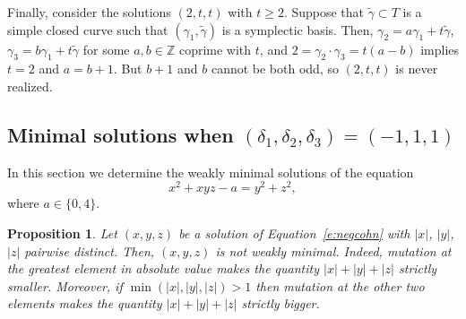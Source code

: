 \documentclass[11pt,a4paper]{amsart}
\newcommand{\Z}{\mathbb Z}
\newcommand{\de}{\delta}
\newcommand{\ga}{\gamma}
\newtheorem{prop}[thm]{Proposition}
\theoremstyle{definition}
\numberwithin{equation}{section}
\begin{document}
Finally, consider the solutions $(2,t,t)$ with $t\geq 2$. 
Suppose that $\widetilde\ga\subset T$ is a simple closed curve such that $(\ga_1,\widetilde\ga)$ is a symplectic basis. 
Then, $\ga_2=a\ga_1+t\widetilde\ga$, $\ga_3 = b\ga_1+t\widetilde\ga$ for some $a,b\in\Z$ coprime with $t$, and $2 = \ga_2\cdot\ga_3 = t(a-b)$ implies $t=2$ and $a=b+1$. 
But $b+1$ and $b$ cannot be both odd, so $(2,t,t)$ is never realized. 


\subsection{Minimal solutions when $(\de_1,\de_2,\de_3)=(-1,1,1)$}\label{ss:-111}

In this section we determine the weakly minimal solutions of the equation  
\begin{equation}\label{e:negcohn}
x^2 + xyz -a = y^2 + z^2,
\end{equation}
where $a \in \{0,4\}$.

\begin{prop}\label{p:negcohn}
	Let $(x,y,z)$ be a solution of Equation~\eqref{e:negcohn} with $|x|$, $|y|$, $|z|$ pairwise distinct.  
	Then, $(x,y,z)$ is not weakly minimal. Indeed, mutation at the greatest element in absolute value makes the quantity $|x|+|y|+|z|$ strictly smaller. Moreover, if $\min(|x|,|y|,|z|)>1$ then mutation at the other 
	two elements makes the quantity $|x|+|y|+|z|$ strictly bigger. 
\end{prop}
\end{document}
